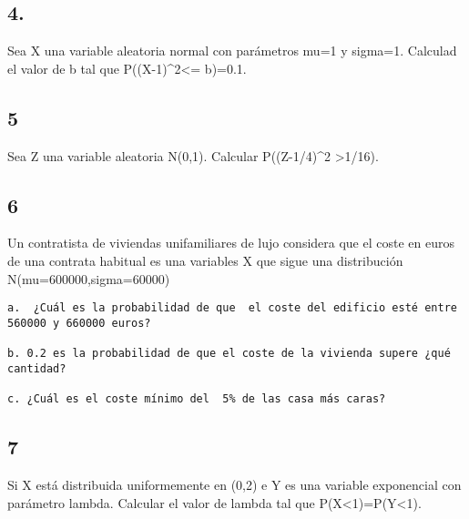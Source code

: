 \documentclass[
  10pt,
]{article}
\begin{document}
\hypertarget{section-2}{%
\subsection{4.}\label{section-2}}

Sea X una variable aleatoria normal con parámetros mu=1 y sigma=1.
Calculad el valor de b tal que P((X-1)\^{}2\textless= b)=0.1.

\hypertarget{section-3}{%
\subsection{5}\label{section-3}}

Sea Z una variable aleatoria N(0,1). Calcular P((Z-1/4)\^{}2
\textgreater1/16).

\hypertarget{section-4}{%
\subsection{6}\label{section-4}}

Un contratista de viviendas unifamiliares de lujo considera que el coste
en euros de una contrata habitual es una variables X que sigue una
distribución N(mu=600000,sigma=60000)

\begin{verbatim}
a.  ¿Cuál es la probabilidad de que  el coste del edificio esté entre 560000 y 660000 euros?

b. 0.2 es la probabilidad de que el coste de la vivienda supere ¿qué cantidad?

c. ¿Cuál es el coste mínimo del  5% de las casa más caras?
\end{verbatim}

\hypertarget{section-5}{%
\subsection{7}\label{section-5}}

Si X está distribuida uniformemente en (0,2) e Y es una variable
exponencial con parámetro lambda. Calcular el valor de lambda tal que
P(X\textless1)=P(Y\textless1).
\end{document}
